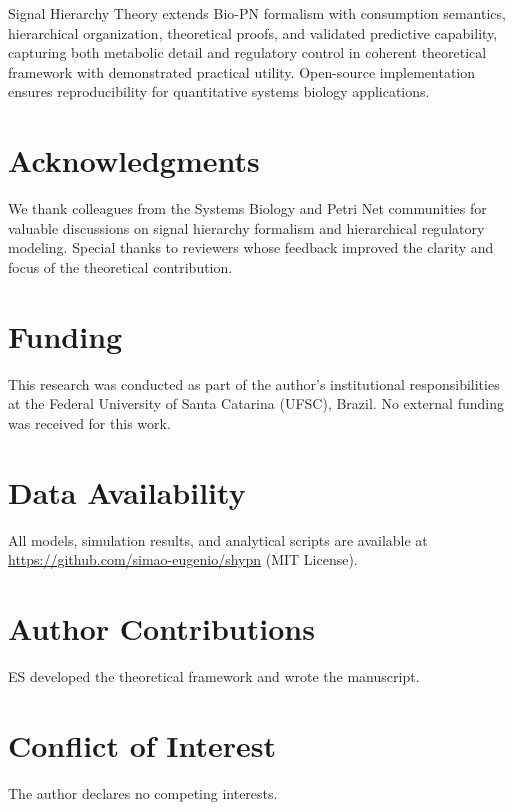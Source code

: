 \documentclass[twocolumn,11pt]{article}
\begin{document}
\vspace{3pt}
\noindent Signal Hierarchy Theory extends Bio-PN formalism with consumption semantics, hierarchical organization, theoretical proofs, and validated predictive capability, capturing both metabolic detail and regulatory control in coherent theoretical framework with demonstrated practical utility. Open-source implementation ensures reproducibility for quantitative systems biology applications.


\section*{Acknowledgments}

\vspace{3pt}
\noindent We thank colleagues from the Systems Biology and Petri Net communities for valuable discussions on signal hierarchy formalism and hierarchical regulatory modeling. Special thanks to reviewers whose feedback improved the clarity and focus of the theoretical contribution.

\section*{Funding}

\vspace{3pt}
\noindent This research was conducted as part of the author's institutional responsibilities at the Federal University of Santa Catarina (UFSC), Brazil. No external funding was received for this work.

\section*{Data Availability}

\vspace{3pt}
\noindent All models, simulation results, and analytical scripts are available at \url{https://github.com/simao-eugenio/shypn} (MIT License).

\section*{Author Contributions}

\vspace{3pt}
\noindent ES developed the theoretical framework and wrote the manuscript.

\section*{Conflict of Interest}

\vspace{3pt}
\noindent The author declares no competing interests.

\balance  %



\end{document}

